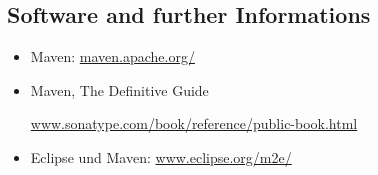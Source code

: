 \subsection{Software and further Informations}
\begin{itemize}
\item Maven: \href{http://maven.apache.org/}{maven.apache.org/}
\item Maven, The Definitive Guide

\href{http://www.sonatype.com/book/reference/public-book.html}
{www.sonatype.com/book/reference/public-book.html}

\item Eclipse und Maven:
  \href{http://www.eclipse.org/m2e/}{www.eclipse.org/m2e/}
%
%
%
%
%
%
%
%
%
%
%
%
%
%
%
\end{itemize}

